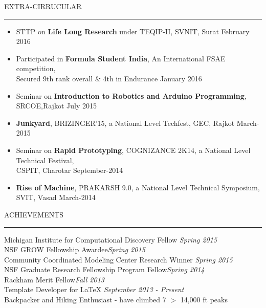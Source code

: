 \documentclass{resume} %
\renewenvironment{rSection}[1]{
\sectionskip
\textcolor{TsinghuaPurple}{\MakeUppercase{#1}}
\sectionlineskip
\hrule
\begin{list}{}{
\setlength{\leftmargin}{0em}
}
\item[]
}{
\end{list}
}
\begin{document}
\begin{rSection}{Extra-Cirrucular} \itemsep -2pt   

\begin{itemize}
 
\item STTP on \textbf{Life Long Research} under TEQIP-II, SVNIT, Surat \hfill February 2016 
\item Participated in \textbf{Formula Student India}, An International FSAE competition,  
\\Secured 9th rank overall \& 4th in Endurance \hfill January 2016  
\item Seminar on \textbf{Introduction to Robotics and Arduino Programming}, SRCOE,Rajkot \hfill July 2015 
\item \textbf{Junkyard}, BRIZINGER'15, a National Level Techfest,  GEC, Rajkot \hfill March-2015
\item Seminar on \textbf{Rapid Prototyping}, COGNIZANCE 2K14, a National Level Technical Festival, \\CSPIT, Charotar  \hfill September-2014   
\item \textbf{Rise of Machine}, PRAKARSH 9.0, a National Level Technical Symposium, SVIT, Vasad \hfill March-2014  
  
\end{itemize}  


\end{rSection} 




\begin{rSection}{Achievements} \itemsep -2pt
{Michigan Institute for Computational Discovery Fellow }\hfill {\em Spring 2015} \\
{NSF GROW Fellowship Awardee}\hfill {\em Spring 2015} \\
{Community Coordinated Modeling Center Research Winner} \hfill {\em Spring 2015} \\
{NSF Graduate Research Fellowship Program Fellow}\hfill {\em Spring 2014}\\
{Rackham Merit Fellow}\hfill {\em Fall 2013}\\
{Template Developer for LaTeX} \hfill {\em September 2013 - Present} \\
{Backpacker and Hiking Enthusiast - have climbed 7 $>$ 14,000 ft peaks}
\end{rSection}
\end{document}
